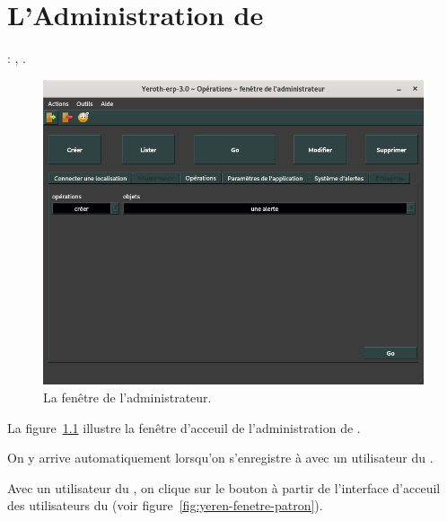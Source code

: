 \chapter{L'Administration de \yeren}\label{chap:administration-logiciel}

\utilisateurs: \lienadmin, \lienmanager.\\



\begin{figure}[!htpb]
\centering
\includegraphics[scale=0.45]{images/yeroth-fenetre-administrateur.png}
\caption{La fen\^etre de l'administrateur.}
\label{fig:fenetre-administrateur}
\end{figure}

La figure~\ref{fig:fenetre-administrateur} illustre la
fen\^etre d'acceuil de l'administration de \yeren.

On y arrive automatiquement lorsqu'on s'enregistre
\`a \yeren avec un utilisateur du \role \admin.

Avec un utilisateur du \role \manager, on clique sur le
bouton  \`a partir de l'interface
d'acceuil des utilisateurs du \role \manager 
(voir figure~\ref{fig:yeren-fenetre-patron}).

\newpage


